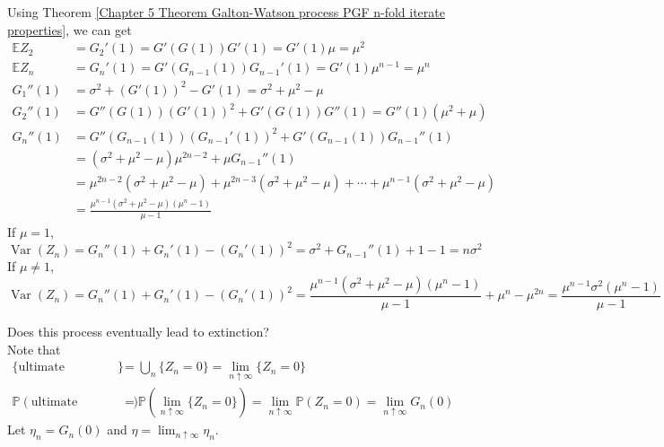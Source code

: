 \documentclass{huhtakm-template-book}
\newcommand{\prob}{\mathbb{P}}
\newcommand{\expect}{\mathbb{E}}
\DeclareMathOperator{\Var}{Var}
\begin{document}
    \begin{proofing}
        Using Theorem \ref{Chapter 5 Theorem Galton-Watson process PGF n-fold iterate properties}, we can get
        \begin{align*}
            \expect Z_{2}&=G_{2}'(1)=G'(G(1))G'(1)=G'(1)\mu=\mu^{2}\\
            \expect Z_{n}&=G_{n}'(1)=G'(G_{n-1}(1))G_{n-1}'(1)=G'(1)\mu^{n-1}=\mu^{n}\\
            G_{1}''(1)&=\sigma^{2}+(G'(1))^{2}-G'(1)=\sigma^{2}+\mu^{2}-\mu\\
            G_{2}''(1)&=G''(G(1))(G'(1))^{2}+G'(G(1))G''(1)=G''(1)(\mu^{2}+\mu)\\
            G_{n}''(1)&=G''(G_{n-1}(1))(G_{n-1}'(1))^{2}+G'(G_{n-1}(1))G_{n-1}''(1)\\
            &=(\sigma^{2}+\mu^{2}-\mu)\mu^{2n-2}+\mu G_{n-1}''(1)\\
            &=\mu^{2n-2}(\sigma^{2}+\mu^{2}-\mu)+\mu^{2n-3}(\sigma^{2}+\mu^{2}-\mu)+\cdots+\mu^{n-1}(\sigma^{2}+\mu^{2}-\mu)\\
            &=\frac{\mu^{n-1}(\sigma^{2}+\mu^{2}-\mu)(\mu^{n}-1)}{\mu-1}
        \end{align*}
        If $\mu=1$,
        \begin{equation*}
            \Var(Z_{n})=G_{n}''(1)+G_{n}'(1)-(G_{n}'(1))^{2}=\sigma^{2}+G_{n-1}''(1)+1-1=n\sigma^{2}
        \end{equation*}
        If $\mu\neq 1$,
        \begin{equation*}
            \Var(Z_{n})=G_{n}''(1)+G_{n}'(1)-(G_{n}'(1))^{2}=\frac{\mu^{n-1}(\sigma^{2}+\mu^{2}-\mu)(\mu^{n}-1)}{\mu-1}+\mu^{n}-\mu^{2n}=\frac{\mu^{n-1}\sigma^{2}(\mu^{n}-1)}{\mu-1}
        \end{equation*}
    \end{proofing}
    \begin{eg}
        Does this process eventually lead to extinction?\\
        Note that
        \begin{align*}
            \{\text{ultimate extinction}\}&=\bigcup_{n}\{Z_{n}=0\}=\lim_{n\uparrow\infty}\{Z_{n}=0\}\\
            \prob(\text{ultimate extinction})&=\prob\left(\lim_{n\uparrow\infty}\{Z_{n}=0\}\right)=\lim_{n\uparrow\infty}\prob(Z_{n}=0)=\lim_{n\uparrow\infty}G_{n}(0)
        \end{align*}
        Let $\eta_{n}=G_{n}(0)$ and $\eta=\lim_{n\uparrow\infty}\eta_{n}$.
    \end{eg}
\end{document}
